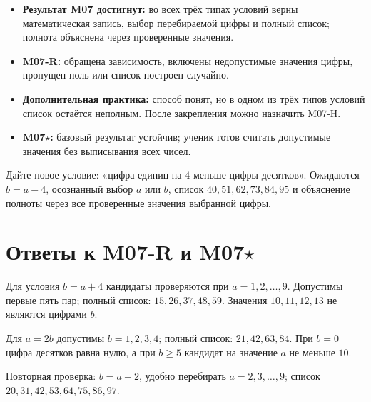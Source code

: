\begin{resultbox}
  \begin{itemize}
    \item \textbf{Результат M07 достигнут:} во всех трёх типах условий верны
      математическая запись, выбор перебираемой цифры и полный список;
      полнота объяснена через проверенные значения.
    \item \textbf{M07-R:} обращена зависимость, включены недопустимые значения
      цифры, пропущен ноль или список построен случайно.
    \item \textbf{Дополнительная практика:} способ понят, но в одном из трёх
      типов условий список остаётся неполным. После закрепления можно
      назначить M07-H.
    \item \textbf{M07\(\star\):} базовый результат устойчив; ученик готов
      считать допустимые значения без выписывания всех чисел.
  \end{itemize}
\end{resultbox}

\begin{teacherbox}
  Дайте новое условие: «цифра единиц на \(4\) меньше цифры десятков».
  Ожидаются \(b=a-4\), осознанный выбор \(a\) или \(b\), список
  \(40,51,62,73,84,95\) и объяснение полноты через все проверенные значения
  выбранной цифры.
\end{teacherbox}

\newpage
\section{Ответы к M07-R и M07\(\star\)}

\begin{teacherbox}[Ответы M07-R]
  Для условия \(b=a+4\) кандидаты проверяются при
  \(a=1,2,\ldots,9\). Допустимы первые пять пар; полный список:
  \(15,26,37,48,59\). Значения \(10,11,12,13\) не являются цифрами \(b\).

  Для \(a=2b\) допустимы \(b=1,2,3,4\); полный список:
  \(21,42,63,84\). При \(b=0\) цифра десятков равна нулю, а при \(b\geq5\)
  кандидат на значение \(a\) не меньше \(10\).

  Повторная проверка: \(b=a-2\), удобно перебирать
  \(a=2,3,\ldots,9\); список \(20,31,42,53,64,75,86,97\).
\end{teacherbox}

